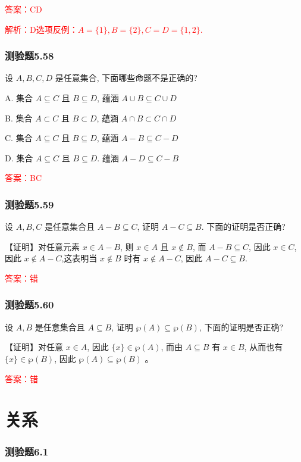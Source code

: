 \documentclass[UTF8, heading=true]{ctexart}
\begin{document}
\textcolor{red}{答案：CD}

\textcolor{red}{解析：D选项反例：$A=\{1\},B=\{2\},C=D=\{1,2\}$.}

\subsubsection{测验题5.58}
设 $A, B, C, D$ 是任意集合, 下面哪些命题不是正确的?

A. 
集合 $A \subseteq C$ 且 $B \subseteq D$, 蕴涵 $A \cup B \subseteq C \cup D$

B. 
集合 $A \subset C$ 且 $B \subset D$, 蕴涵 $A \cap B \subset C \cap D$

C. 
集合 $A \subseteq C$ 且 $B \subseteq D$, 蕴涵 $A-B \subseteq C-D$

D. 
集合 $A \subseteq C$ 且 $B \subseteq D$. 蕴涵 $A-D \subseteq C-B$

\textcolor{red}{答案：BC}

\subsubsection{测验题5.59}

设 $A, B, C$ 是任意集合且 $A-B \subseteq C$, 证明 $A-C \subseteq B$. 下面的证明是否正确?

【证明】对任意元素 $x \in A-B$, 则 $x \in A$ 且 $x \notin B$, 而 $A-B \subseteq C$, 因此 $x \in C$, 因此 $x \notin A-C$,这表明当 $x \notin B$ 时有 $x \notin A-C$, 因此 $A-C \subseteq B$.

\textcolor{red}{答案：错}
\subsubsection{测验题5.60}
设 $A, B$ 是任意集合且 $A \subseteq B$, 证明 $\wp(A) \subseteq \wp(B)$, 下面的证明是否正确?

【证明】对任意 $x \in A$, 因此 $\{x\} \in \wp(A)$, 而由 $A \subseteq B$ 有 $x \in B$, 从而也有 $\{x\} \in \wp(B)$, 因此 $\wp(A) \subseteq \wp(B)$ 。

\textcolor{red}{答案：错}


\clearpage

\section{关系}

\subsubsection{测验题6.1}
\end{document}
